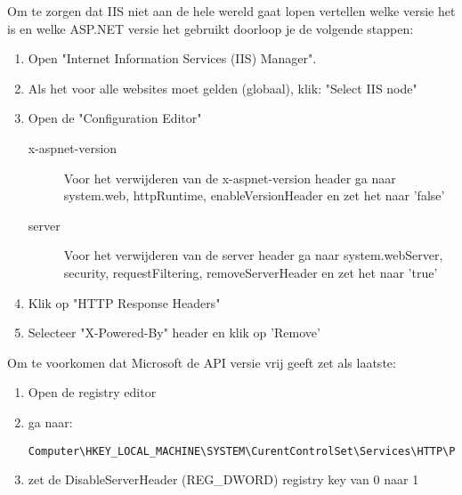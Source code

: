 Om te zorgen dat IIS niet aan de hele wereld gaat lopen vertellen welke versie het is en welke ASP.NET versie het gebruikt doorloop je de volgende stappen:
\begin{enumerate}
\item Open "Internet Information Services (IIS) Manager".
\item Als het voor alle websites moet gelden (globaal), klik: "Select IIS node"
\item Open de "Configuration Editor"
\begin{description}
\item[x-aspnet-version] Voor het verwijderen van de x-aspnet-version header ga naar system.web, httpRuntime, enableVersionHeader en zet het naar 'false'
\item[server] Voor het verwijderen van de server header ga naar system.webServer, security, requestFiltering, removeServerHeader en zet het naar 'true'
\end{description}
\item Klik op "HTTP Response Headers"
\item Selecteer "X-Powered-By" header en klik op 'Remove'
\end{enumerate}

Om te voorkomen dat Microsoft de API versie vrij geeft zet als laatste:
\begin{enumerate}
	\item Open de registry editor
	\item ga naar:
		\begin{lstlisting}
Computer\HKEY_LOCAL_MACHINE\SYSTEM\CurentControlSet\Services\HTTP\Parameters
		\end{lstlisting}
	\item zet de DisableServerHeader (REG\_DWORD) registry key van 0 naar 1
\end{enumerate}
